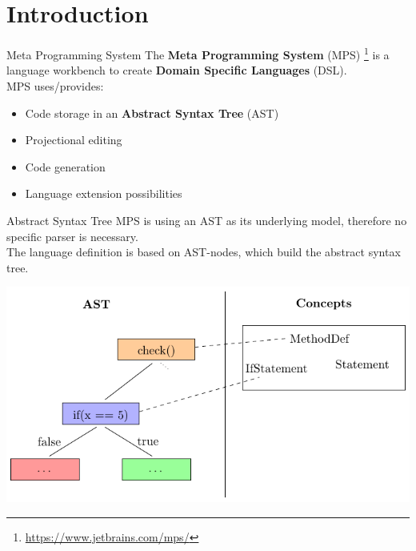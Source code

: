 



    \begin{frame}
        \setcounter{framenumber}{0}
        \titlepage
    \end{frame}

    \begin{frame}
        \frametitle{\contentsname}
        \tableofcontents[hideothersubsections]
    \end{frame}

    \section{Introduction}
    
    \begin{frame}{Meta Programming System}
    	The \textbf{Meta Programming System} (MPS) \footnote{\url{https://www.jetbrains.com/mps/}} is a language workbench to create \textbf{Domain Specific Languages} (DSL).\\
    	
    	MPS uses/provides:
    	\begin{itemize}
    		\item Code storage in an \textbf{Abstract Syntax Tree} (AST)
    		\item Projectional editing
    		\item Code generation
    		\item Language extension possibilities
    	\end{itemize}
    \end{frame}

	\begin{frame}{Abstract Syntax Tree}
		MPS is using an AST as its underlying model, therefore no specific parser is necessary.\\
		
		The language definition is based on AST-nodes, which build the abstract syntax tree.
		\begin{center}
			\includegraphics[height=0.7\textheight]{tikz/ast.pdf}
		\end{center}
	\end{frame}

